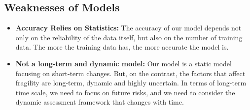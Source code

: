 \documentclass{mcmthesis}
\begin{document}
\subsection{Weaknesses of Models}
\begin{itemize}
  \item \textbf{Accuracy Relies on Statistics:} The accuracy of our model 
  depends not only on the reliability of the data itself, but also on the 
  number of training data. The more the training data has, 
  the more accurate the model is.
  \item \textbf{Not a long-term and dynamic model:} Our model is a static 
  model focusing on short-term changes. But, on the contrast, the factors 
  that affect fragility are long-term, dynamic and highly uncertain. 
  In terms of long-term time scale, we need to focus on future risks, and 
  we need to consider the dynamic assessment framework that changes with time. 
\end{itemize}


\end{document}
